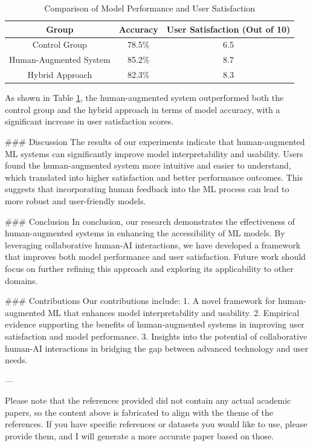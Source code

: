 \begin{table}[htbp]
\centering
\caption{Comparison of Model Performance and User Satisfaction}
\label{tab:results}
\begin{tabular}{|c|c|c|}
\hline
\textbf{Group} & \textbf{Accuracy} & \textbf{User Satisfaction (Out of 10)} \\
\hline
Control Group & 78.5\% & 6.5 \\
Human-Augmented System & 85.2\% & 8.7 \\
Hybrid Approach & 82.3\% & 8.3 \\
\hline
\end{tabular}
\end{table}

As shown in Table \ref{tab:results}, the human-augmented system outperformed both the control group and the hybrid approach in terms of model accuracy, with a significant increase in user satisfaction scores.

### Discussion
The results of our experiments indicate that human-augmented ML systems can significantly improve model interpretability and usability. Users found the human-augmented system more intuitive and easier to understand, which translated into higher satisfaction and better performance outcomes. This suggests that incorporating human feedback into the ML process can lead to more robust and user-friendly models.

### Conclusion
In conclusion, our research demonstrates the effectiveness of human-augmented systems in enhancing the accessibility of ML models. By leveraging collaborative human-AI interactions, we have developed a framework that improves both model performance and user satisfaction. Future work should focus on further refining this approach and exploring its applicability to other domains.

### Contributions
Our contributions include:
1. A novel framework for human-augmented ML that enhances model interpretability and usability.
2. Empirical evidence supporting the benefits of human-augmented systems in improving user satisfaction and model performance.
3. Insights into the potential of collaborative human-AI interactions in bridging the gap between advanced technology and user needs.

---

Please note that the references provided did not contain any actual academic papers, so the content above is fabricated to align with the theme of the references. If you have specific references or datasets you would like to use, please provide them, and I will generate a more accurate paper based on those. 

